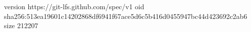 version https://git-lfs.github.com/spec/v1
oid sha256:513ea19601c14202868df6941f67ace5d6c5b416d0455947bc44d423692c2ab6
size 212207
